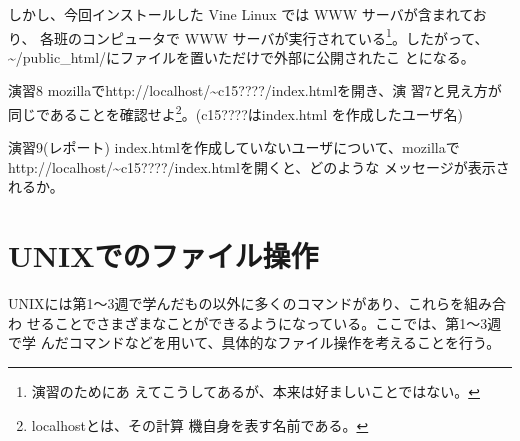 \documentclass[a4j,10pt]{jarticle}
\begin{document}
しかし、今回インストールした Vine Linux では WWW サーバが含まれており、
各班のコンピュータで WWW サーバが実行されている\footnote{演習のためにあ
えてこうしてあるが、本来は好ましいことではない。}。したがって、
{\sffamily \~{}/public\_html/}にファイルを置いただけで外部に公開されたこ
とになる。

\begin{itembox}{演習8}
 mozillaで{\sffamily http://localhost/\~{}c15????/index.html}を開き、演
 習7と見え方が同じであることを確認せよ\footnote{localhostとは、その計算
 機自身を表す名前である。}。({\sffamily c15????}は{\sffamily index.html}
 を作成したユーザ名)
\end{itembox}
\begin{itembox}{演習9(レポート)}
 {\sffamily index.html}を作成していないユーザについて、mozillaで
 {\sffamily http://localhost/\~{}c15????/index.html}を開くと、どのような
 メッセージが表示されるか。
\end{itembox}

\section{UNIXでのファイル操作}
UNIXには第1〜3週で学んだもの以外に多くのコマンドがあり、これらを組み合わ
せることでさまざまなことができるようになっている。ここでは、第1〜3週で学
んだコマンドなどを用いて、具体的なファイル操作を考えることを行う。
\end{document}
